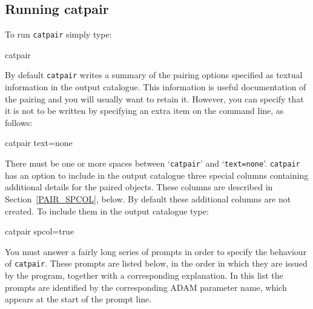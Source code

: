\documentclass[twoside,11pt]{starlink}
\begin{document}
\subsection{Running catpair}

To run \texttt{catpair} simply type:

\begin{terminalv}
catpair
\end{terminalv}

By default \texttt{catpair} writes a summary of the pairing options
specified as textual information in the output catalogue.  This
information is useful documentation of the pairing and you will
usually want to retain it.  However, you can specify that it is not to
be written by specifying an extra item on the command line, as follows:

\begin{terminalv}
catpair  text=none
\end{terminalv}

There must be one or more spaces between `\texttt{catpair}' and `\texttt{text=none}'.  \texttt{catpair} has an option to include in the output
catalogue three special columns containing additional details for the
paired objects.  These columns are described in Section~\ref{PAIR_SPCOL},
below.  By default these additional columns are not created.  To include
them in the output catalogue type:

\begin{terminalv}
catpair  spcol=true
\end{terminalv}

You must answer a fairly long series of prompts in order to
specify the behaviour of \texttt{catpair}. These prompts are listed below,
in the order in which they are issued by the program, together with a
corresponding explanation. In this list the prompts are identified
by the corresponding ADAM parameter name, which appears at the start
of the prompt line.
\end{document}
